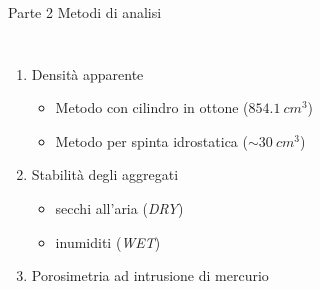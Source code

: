 \documentclass[10pt]{beamer}
\begin{document}
\begin{frame}{Parte 2 \small{Metodi di analisi}}
  \begin{columns}[c]
    \begin{enumerate}[<+->]
    \item Densit\`a apparente
      \begin{itemize}
      \item Metodo con cilindro in ottone ($854.1\: cm^3$)
        \pause
      \item Metodo per spinta idrostatica ($\sim 30 \: cm^3$)
        \pause
      \end{itemize}
    \item Stabilit\`a degli aggregati
      \begin{itemize}
      \item secchi all'aria (\emph{DRY})
      \item inumiditi (\emph{WET})
      \end{itemize}
      \pause
    \item Porosimetria ad intrusione di mercurio
    \end{enumerate}

\end{columns}
\end{frame}
\end{document}
